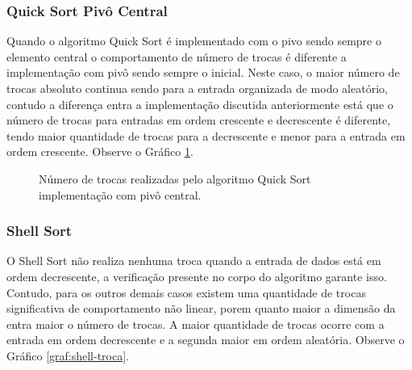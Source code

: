 \documentclass[conference,onecolumn]{IEEEtran}
\begin{document}
\subsubsection{Quick Sort Pivô Central}

Quando o algoritmo Quick Sort é implementado com o pivo sendo sempre o elemento central o comportamento de número de trocas é diferente a implementação com pivô sendo sempre o inicial. Neste caso, o maior número de trocas absoluto continua sendo para a entrada organizada de modo aleatório, contudo a diferença entra a implementação discutida anteriormente está que o número de trocas para entradas em ordem crescente e decrescente é diferente, tendo maior quantidade de trocas para a decrescente e menor para a entrada em ordem crescente. Observe o Gráfico \ref{graf:quick-central-troca}.

\begin{figure}[H]
\begin{center}
\end{center}
\caption{Número de trocas realizadas pelo algoritmo Quick Sort implementação com pivô central.}
\label{graf:quick-central-troca}
\end{figure}

\subsubsection{Shell Sort}

O Shell Sort não realiza nenhuma troca quando a entrada de dados está em ordem decrescente, a verificação presente no corpo do algoritmo garante isso. Contudo, para os outros demais casos existem uma quantidade de trocas significativa de comportamento não linear, porem quanto maior a dimensão da entra maior o número de trocas. A maior quantidade de trocas ocorre com a entrada em ordem decrescente e a segunda maior em ordem aleatória. Observe o Gráfico \ref{graf:shell-troca}.
\end{document}
